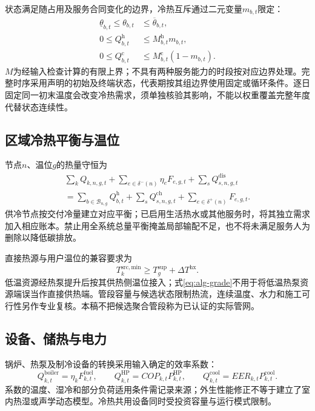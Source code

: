 状态满足随占用及服务合同变化的边界，冷热互斥通过二元变量$m_{b,t}$限定：
\begin{align}
\underline\theta_{b,t}\leq\theta_{b,t}&\leq\overline\theta_{b,t},\\
0\leq Q_{b,t}^{\mathrm h}&\leq M_{b,t}^{\mathrm h}m_{b,t},\\
0\leq Q_{b,t}^{\mathrm c}&\leq M_{b,t}^{\mathrm c}(1-m_{b,t}).
\label{eq:rc-exclusive}
\end{align}
$M$为经输入检查计算的有限上界；不具有两种服务能力的时段按对应边界处理。完整时序采用声明的初始及终端状态，代表期按其组边界使用固定或循环条件。逐日固定同一初末温度会改变冷热需求，须单独核验其影响，不能以权重覆盖完整年度代替状态连续性。

\subsection{区域冷热平衡与温位}

节点$n$、温位$g$的热量守恒为
\begin{multline}
\sum_kQ_{k,n,g,t}+\sum_{e\in\delta^-(n)}\eta_eF_{e,g,t}
+\sum_sQ_{s,n,g,t}^{\mathrm{dis}}\\
=\sum_{b\in\mathcal B_{n,g}}Q_{b,t}^{\mathrm h}
+\sum_sQ_{s,n,g,t}^{\mathrm{ch}}+\sum_{e\in\delta^+(n)}F_{e,g,t}.
\label{eq:node-heat-balance}
\end{multline}
供冷节点按交付冷量建立对应平衡；已启用生活热水或其他服务时，将其独立需求加入相应账本。禁止用全系统总量平衡掩盖局部输配不足，也不将未满足服务人为删除以降低碳排放。

直接热源与用户温位的兼容要求为
\begin{equation}
T_k^{\mathrm{src,min}}\geq T_g^{\mathrm{sup}}+\Delta T^{\mathrm{hx}}.
\label{eq:alg-grade}
\end{equation}
低温资源经热泵提升后按其供热侧温位接入；式\eqref{eq:alg-grade}不用于将低温热泵资源端误当作直接供热端。管段容量与候选状态限制热流，连续温度、水力和施工可行性另作专业复核。本稿不把候选聚合管段称为已认证的实际管网。

\subsection{设备、储热与电力}

锅炉、热泵及制冷设备的转换采用输入确定的效率系数：
\begin{equation}
Q_{k,t}^{\mathrm{boiler}}=\eta_kF_{k,t}^{\mathrm{fuel}},\qquad
Q_{k,t}^{\mathrm{HP}}=COP_{k,t}P_{k,t}^{\mathrm{HP}},\qquad
Q_{k,t}^{\mathrm{cool}}=EER_{k,t}P_{k,t}^{\mathrm{cool}}.
\end{equation}
系数的温度、湿冷和部分负荷适用条件需记录来源；外生性能修正不等于建立了室内热湿或声学动态模型。冷热共用设备同时受投资容量与运行模式限制。

